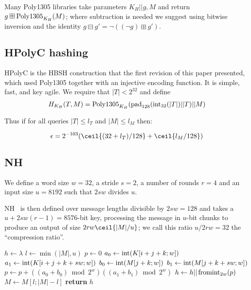 \documentclass[eprint.tex]{subfiles}
\begin{document}
Many Poly1305 libraries
take parameters $K_H || g, M$ and return $g \boxplus \operatorname{Poly1305}_{K_H}(M)$; where subtraction
is needed we suggest using bitwise inversion and the identity
$g \boxminus g' = \neg ((\neg g) \boxplus g')$.

\subsection{HPolyC hashing}
HPolyC is the HBSH construction that the first revision of this paper presented, which used
Poly1305 together with an injective encoding function.
It is simple, fast, and key agile. We require that $|T| < 2^{32}$ and define
\begin{align*}
H_{K_H}(T, M) = \operatorname{Poly1305}_{K_H}(\operatorname{pad}_{128}(\operatorname{int}_{32}(|T|) || T) || M)
\end{align*}

Thus if for all queries $|T| \leq l_T$ and $|M| \leq l_M$ then:

\begin{displaymath}
\epsilon = 2^{-103}(\ceil{(32 + l_T)/128} + \ceil{l_M/128})
\end{displaymath}

\subsection{NH}\label{nh}

We define a word size $w = 32$, a stride $s = 2$,
a number of rounds $r = 4$ and an input size $u = 8192$ such that $2sw$ divides $u$.

NH~\cite{umac1,umac2,rfc4418} is then defined over message
lengths divisible by $2sw = 128$
and takes a $u + 2sw(r -1) = 8576$-bit key, processing the message
in $u$-bit chunks to produce
an output of size $2rw\ceil{|M|/u}$; we call this ratio $u/2rw = 32$ the ``compression ratio''.

\begin{algorithmic}[0]
    \State $h \gets \lambda$
        \State $l \gets \min{(|M|, u)}$
            \State $p \gets 0$
                    \State $a_0 \gets \operatorname{int}(K[i+j+k;w])$
                    \State $a_1 \gets \operatorname{int}(K[i+j+k+sw;w])$
                    \State $b_0 \gets \operatorname{int}(M[j+k;w])$
                    \State $b_1 \gets \operatorname{int}(M[j+k+sw;w])$
                    \State $p \gets p + ((a_0 + b_0) \bmod 2^w)((a_1 + b_1) \bmod 2^w)$
                \EndFor
            \EndFor
            \State $h \gets h || \operatorname{fromint}_{2w}(p)$
        \EndFor
        \State $M \gets M[l;|M| - l]$
    \EndWhile
    \State \textbf{return} $h$
    \EndProcedure
\end{algorithmic}
\end{document}
